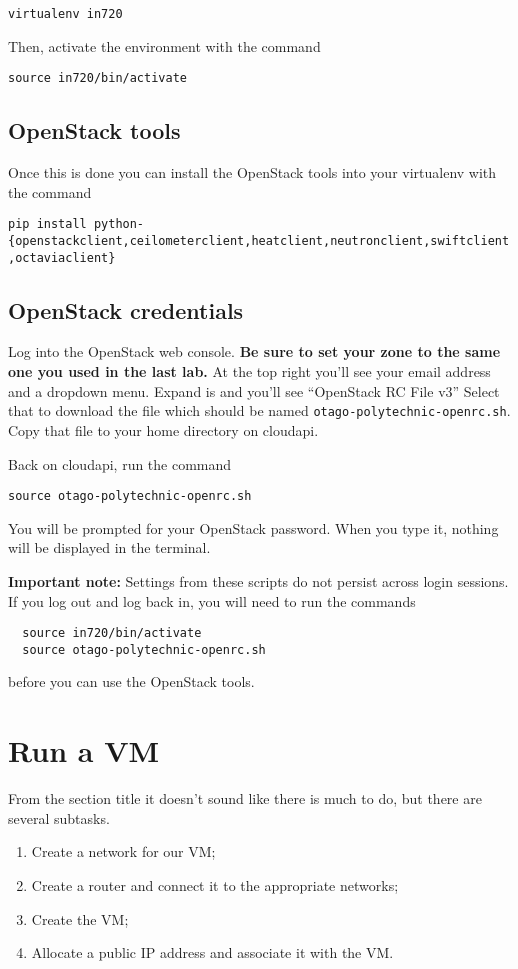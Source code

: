 \documentclass{article}
\begin{document}
  \texttt{virtualenv in720}
  
  Then, activate the environment with the command
  
  \texttt{source in720/bin/activate}
  
   \subsection{OpenStack tools}
   
  Once this is done you can install the OpenStack tools into your virtualenv with the command
  
  \texttt{pip install python-\{openstackclient,ceilometerclient,heatclient,neutronclient,swiftclient,octaviaclient\}}
  
  \subsection{OpenStack credentials}
  Log into the OpenStack web console. \textbf{Be sure to set your zone to the same one you used in the last lab.} At the top right you'll see your email address and a dropdown menu. Expand is and you'll see ``OpenStack RC File v3'' Select that to download the file which should be named \texttt{otago-polytechnic-openrc.sh}. Copy that file to your home directory on cloudapi.
  
  Back on cloudapi, run the command
  
  \texttt{source otago-polytechnic-openrc.sh}
  
  You will be prompted for your OpenStack password. When you type it, nothing will be displayed in the terminal.
  
  \textbf{Important note:} Settings from these scripts do not persist across login sessions. If you log out and log back in, you will need to run the commands
  
  \begin{verbatim}
  source in720/bin/activate
  source otago-polytechnic-openrc.sh
  \end{verbatim}
  
 before you can use the OpenStack tools.
 
 \section{Run a VM}
 From the section title it doesn't sound like there is much to do, but there are several subtasks. 
 
 \begin{enumerate}
   \item Create a network for our VM;
   \item Create a router and connect it to the appropriate networks;
   \item Create the VM;
   \item Allocate a public IP address and associate it with the VM.
  \end{enumerate}
  
\end{document}
